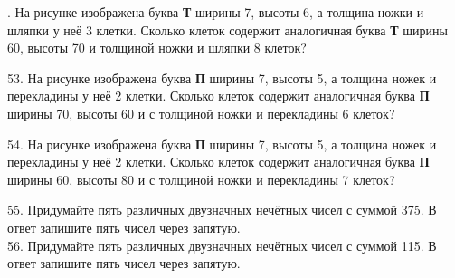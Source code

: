 \documentclass[12pt]{article}
\begin{document}
\newpage
{}. На рисунке изображена буква {\bf Т} ширины 7, высоты 6, а толщина ножки и шляпки у неё 3 клетки. Сколько клеток содержит аналогичная буква {\bf Т} ширины 60, высоты 70 и толщиной ножки и шляпки 8 клеток?
\begin{center}
\begin{figure}[ht!]
\end{figure}
\end{center}
53. На рисунке изображена буква {\bf П} ширины 7, высоты 5, а толщина ножек и перекладины у неё 2 клетки. Сколько клеток содержит аналогичная буква {\bf П} ширины 70, высоты 60 и с толщиной ножки и перекладины 6 клеток?
\begin{center}
\begin{figure}[ht!]
\end{figure}
\end{center}
54. На рисунке изображена буква {\bf П} ширины 7, высоты 5, а толщина ножек и перекладины у неё 2 клетки. Сколько клеток содержит аналогичная буква {\bf П} ширины 60, высоты 80 и с толщиной ножки и перекладины 7 клеток?
\begin{center}
\begin{figure}[ht!]
\end{figure}
\end{center}
55. Придумайте пять различных двузначных нечётных чисел с суммой 375. В ответ запишите пять чисел через запятую.\\
56. Придумайте пять различных двузначных нечётных чисел с суммой 115. В ответ запишите пять чисел через запятую.\\
\end{document}
